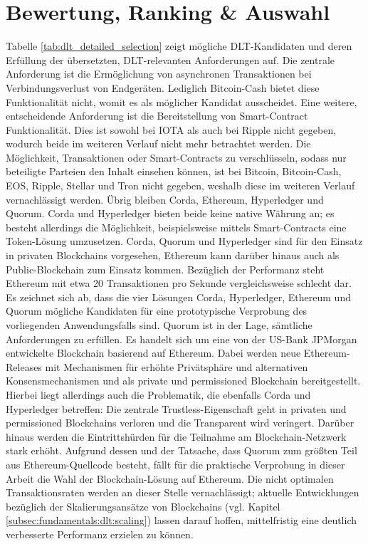 %
%
\section{Bewertung, Ranking \& Auswahl}
\label{sec:dlt_selection:rating}
Tabelle \ref{tab:dlt_detailed_selection} zeigt mögliche \ac{DLT}-Kandidaten und deren Erfüllung der übersetzten, \ac{DLT}-relevanten Anforderungen auf. Die zentrale Anforderung ist die Ermöglichung von asynchronen Transaktionen bei Verbindungsverlust von Endgeräten. Lediglich Bitcoin-Cash bietet diese Funktionalität nicht, womit es als möglicher Kandidat ausscheidet. Eine weitere, entscheidende Anforderung ist die Bereitstellung von Smart-Contract Funktionalität. Dies ist sowohl bei IOTA als auch bei Ripple nicht gegeben, wodurch beide im weiteren Verlauf nicht mehr betrachtet werden. Die Möglichkeit, Transaktionen oder Smart-Contracts zu verschlüsseln, sodass nur beteiligte Parteien den Inhalt einsehen können, ist bei Bitcoin, Bitcoin-Cash, EOS, Ripple, Stellar und Tron nicht gegeben, weshalb diese im weiteren Verlauf vernachlässigt werden. Übrig bleiben Corda, Ethereum, Hyperledger und Quorum. Corda und Hyperledger bieten beide keine native Währung an; es besteht allerdings die Möglichkeit, beispielsweise mittels Smart-Contracts eine Token-Lösung umzusetzen. Corda, Quorum und Hyperledger sind für den Einsatz in privaten Blockchains vorgesehen, Ethereum kann darüber hinaus auch als Public-Blockchain zum Einsatz kommen. Bezüglich der Performanz steht Ethereum mit etwa 20 Transaktionen pro Sekunde vergleichsweise schlecht dar.\\
Es zeichnet sich ab, dass die vier Lösungen Corda, Hyperledger, Ethereum und Quorum mögliche Kandidaten für eine prototypische Verprobung des vorliegenden Anwendungsfalls sind. Quorum ist in der Lage, sämtliche Anforderungen zu erfüllen. Es handelt sich um eine von der US-Bank JPMorgan entwickelte Blockchain basierend auf Ethereum. Dabei werden neue Ethereum-Releases mit Mechanismen für erhöhte Privätsphäre und alternativen Konsensmechanismen und als private und permissioned Blockchain bereitgestellt. Hierbei liegt allerdings auch die Problematik, die ebenfalls Corda und Hyperledger betreffen: Die zentrale Trustless-Eigenschaft geht in privaten und permissioned Blockchains verloren und die Transparent wird veringert. Darüber hinaus werden die Eintrittshürden für die Teilnahme am Blockchain-Netzwerk stark erhöht. Aufgrund dessen und der Tatsache, dass Quorum zum größten Teil aus Ethereum-Quellcode besteht, fällt für die praktische Verprobung in dieser Arbeit die Wahl der Blockchain-Lösung auf Ethereum. Die nicht optimalen Transaktionsraten werden an dieser Stelle vernachlässigt; aktuelle Entwicklungen bezüglich der Skalierungsansätze von Blockchains (vgl. Kapitel \ref{subsec:fundamentals:dlt:scaling}) lassen darauf hoffen, mittelfristig eine deutlich verbesserte Performanz erzielen zu können.
